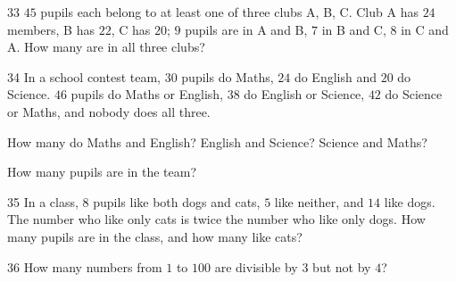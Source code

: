 \gap
\begin{probbox}{33}{}
$45$ pupils each belong to at least one of three clubs A, B, C. Club A has $24$ members, B has $22$, C has $20$; $9$ pupils are in A and B, $7$ in B and C, $8$ in C and A. How many are in all three clubs?
\end{probbox}
\gap
\begin{probbox}{34}{}
In a school contest team, $30$ pupils do Maths, $24$ do English and $20$ do Science. $46$ pupils do Maths or English, $38$ do English or Science, $42$ do Science or Maths, and nobody does all three.\par
{} How many do Maths and English? \quad {} English and Science? \quad {} Science and Maths?\par
{} How many pupils are in the team?
\end{probbox}
\gap
\begin{probbox}{35}{}
In a class, $8$ pupils like both dogs and cats, $5$ like neither, and $14$ like dogs. The number who like only cats is twice the number who like only dogs. How many pupils are in the class, and how many like cats?
\end{probbox}
\gap
\begin{probbox}{36}{}
How many numbers from $1$ to $100$ are divisible by $3$ but not by $4$?
\end{probbox}
